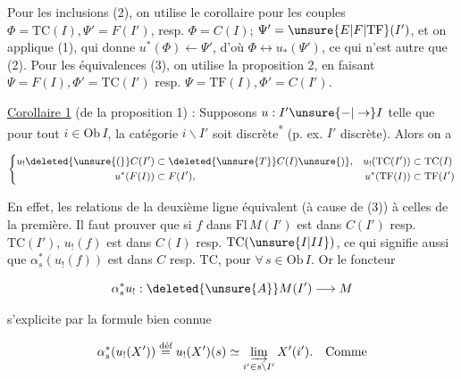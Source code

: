 
Pour les  inclusions (2), on utilise le corollaire  pour les couples $\Phi=\mathrm{TC}(I),\Psi'=F(I')$, resp. $\Phi=C(I)$; $\Psi'=\unsure{E|F|\mathrm{TF}}(I')$, et on applique (1), qui donne $u^*(\Phi)\leftarrow\Psi'$, d'où $\Phi\longleftrightarrow u_*(\Psi')$, ce qui n'est autre que (2). Pour les équivalences (3), on utilise la proposition 2, en faisant $\Psi=F(I),\Phi'=\mathrm{TC}(I')$ resp. $\Psi=\mathrm{TF}(I),\Phi'=C(I')$.

\uline{Corollaire 1} (de la proposition 1) : Supposons $u:I'\unsure{-|\to}I$ telle que pour tout $i\in\mathrm{Ob}\,I$, la catégorie $i\backslash I'$ soit discrète\textsuperscript{*}  (p. ex. $I'$ discrète). Alors on a



\[ \left\{\begin{aligned}
u_!\deleted{\unsure{(}}C(I')&\subset\deleted{\unsure{T}}C(I)\unsure{)},&u_!(\mathrm{TC}(I'))&\subset\mathrm{TC}(I)\\
u^*(F(I))&\subset F(I'),&u^*(\mathrm{TF}(I))&\subset\mathrm{TF}(I')
\end{aligned}\right. \]

En effet, les relations de la deuxième ligne équivalent (à cause de (3)) à celles de la première. Il faut prouver que si $f$ dans $\mathrm{Fl}\,M(I')$ est dans $C(I')$ resp. $\mathrm{TC}(I')$, $u_!(f)$ est dans $C(I)$ resp. $\mathrm{TC}(\unsure{I|II})$, ce qui signifie aussi que $\alpha_s^*(u_!(f))$ est dans $C$ resp. $\mathrm{TC}$, pour $\forall\,s\in\mathrm{Ob}\,I$. Or le foncteur

\[ \alpha_s^*u_!:\deleted{\unsure{A}}M(I')\longrightarrow M \]

s'explicite par la formule bien connue

\[ \alpha_s^*(u_!(X'))\overset{\text{déf}}{=}u_!(X')(s)\simeq\varinjlim_{i'\in s\backslash I'}X'(i').\quad\text{Comme} \]
